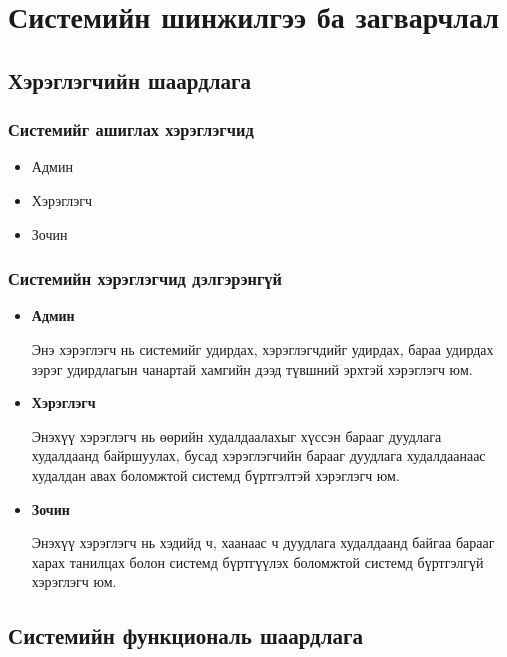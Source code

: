 
\chapter{Системийн шинжилгээ ба загварчлал} %
\label{Chapter2} %


\section{ Хэрэглэгчийн шаардлага }
\subsection{Системийг ашиглах хэрэглэгчид}
    \begin{itemize}
    \item Админ
    \item Хэрэглэгч
    \item Зочин
\end{itemize}

\subsection{Системийн хэрэглэгчид дэлгэрэнгүй}
\begin{itemize}
    \item \textbf{Админ}
    \par\noindent Энэ хэрэглэгч нь системийг удирдах, хэрэглэгчдийг удирдах, бараа удирдах зэрэг удирдлагын чанартай хамгийн дээд түвшний эрхтэй хэрэглэгч юм.
    \item \textbf{Хэрэглэгч}
    \par\noindent Энэхүү хэрэглэгч нь өөрийн худалдаалахыг хүссэн барааг дуудлага худалдаанд байршуулах, бусад хэрэглэгчийн барааг дуудлага худалдаанаас худалдан авах боломжтой системд бүртгэлтэй хэрэглэгч юм.
    \item \textbf{Зочин}
    \par\noindent Энэхүү хэрэглэгч нь хэдийд ч, хаанаас ч дуудлага худалдаанд байгаа барааг харах танилцах болон системд бүртгүүлэх боломжтой системд бүртгэлгүй хэрэглэгч юм. 
\end{itemize}
\newpage
    \section{Системийн функциональ шаардлага}
